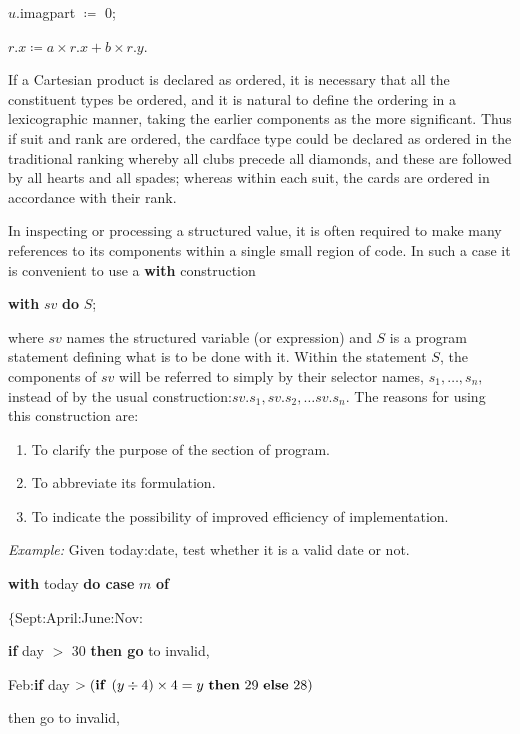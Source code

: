 \documentclass[twoside,11pt]{book}
\begin{document}
\quad $u$.imagpart $\coloneq$ 0;

\quad $r.x \coloneq a\times r.x + b\times r.y$.

If a Cartesian product is declared as ordered, it is necessary that all the constituent types be ordered, and it is natural to define the ordering in a lexicographic manner, taking the earlier components as the more significant. Thus if suit and rank are ordered, the cardface type could be declared as ordered in the traditional ranking whereby all clubs precede all diamonds, and these are followed by all hearts and all spades; whereas within each suit, the cards are ordered in accordance with their rank.

In inspecting or processing a structured value, it is often required to make many references to its components within a single small region of code. In such a case it is convenient to use a \textbf{with} construction

\quad \textbf{with} $sv$ \textbf{do} $S$;

\noindent
where $sv$ names the structured variable (or expression) and $S$ is a program statement defining what is to be done with it. Within the statement $S$, the components of $sv$ will be referred to simply by their selector names, $s_1, \dots, s_n,$ instead of by the usual construction:$sv.s_1, sv.s_2, \dots sv.s_n$. The reasons for using this construction are:

\begin{enumerate}[wide, nosep, label=(\arabic*)]
	\item To clarify the purpose of the section of program.
	\item To abbreviate its formulation.
	\item To indicate the possibility of improved efficiency of implementation.
\end{enumerate}

\noindent
\textit{Example:} Given today:date, test whether it is a valid date or not.

\quad \textbf{with} today \textbf{do case} $m$ \textbf{of}

\quad \quad $\{$Sept:April:June:Nov:

\quad \quad \quad \textbf{if} day $>$ 30 \textbf{then go} to invalid,

\quad \quad \quad Feb:\textbf{if} day $> (\text{\textbf{if }} (y \div 4) \times 4 = y \text{ \textbf{then} } 29 \text{ \textbf{else} } 28)$

\quad \quad \quad \quad then go to invalid,
\end{document}
